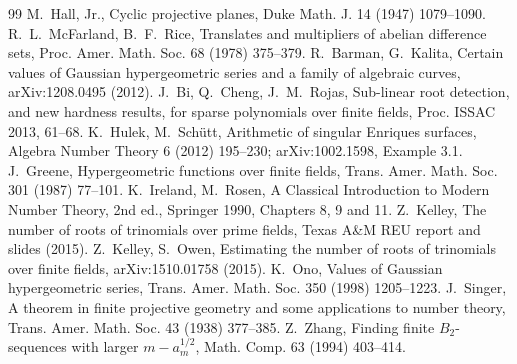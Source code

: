 \documentclass[11pt]{article}
\begin{document}
\begin{thebibliography}{99}
 M.~Hall, Jr., Cyclic projective planes, Duke Math. J. 14 (1947) 1079--1090.
 R.~L.~McFarland, B.~F.~Rice, Translates and multipliers of abelian difference sets, Proc. Amer. Math. Soc. 68 (1978) 375--379.
 R.~Barman, G.~Kalita, Certain values of Gaussian hypergeometric series and a family of algebraic curves, arXiv:1208.0495 (2012).
 J.~Bi, Q.~Cheng, J.~M.~Rojas, Sub-linear root detection, and new hardness results, for sparse polynomials over finite fields, Proc. ISSAC 2013, 61--68.
 K.~Hulek, M.~Sch\"utt, Arithmetic of singular Enriques surfaces, Algebra Number Theory 6 (2012) 195--230; arXiv:1002.1598, Example 3.1.
 J.~Greene, Hypergeometric functions over finite fields, Trans. Amer. Math. Soc. 301 (1987) 77--101.
 K.~Ireland, M.~Rosen, A Classical Introduction to Modern Number Theory, 2nd ed., Springer 1990, Chapters 8, 9 and 11.
 Z.~Kelley, The number of roots of trinomials over prime fields, Texas A\&M REU report and slides (2015).
 Z.~Kelley, S.~Owen, Estimating the number of roots of trinomials over finite fields, arXiv:1510.01758 (2015).
 K.~Ono, Values of Gaussian hypergeometric series, Trans. Amer. Math. Soc. 350 (1998) 1205--1223.
 J.~Singer, A theorem in finite projective geometry and some applications to number theory, Trans. Amer. Math. Soc. 43 (1938) 377--385.
 Z.~Zhang, Finding finite $B_2$-sequences with larger $m-a_m^{1/2}$, Math. Comp. 63 (1994) 403--414.
\end{thebibliography}
\end{document}
